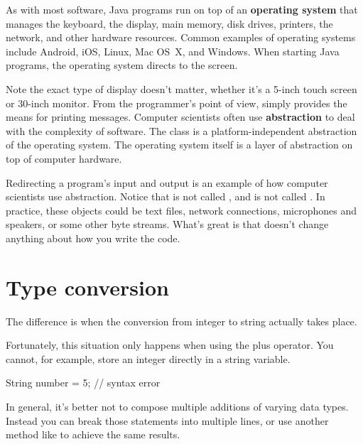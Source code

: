 

As with most software, Java programs run on top of an {\bf operating system} that manages the keyboard, the display, main memory, disk drives, printers, the network, and other hardware resources.
Common examples of operating systems include Android, iOS, Linux, Mac OS~X, and Windows.
When starting Java programs, the operating system directs  to the screen.


Note the exact type of display doesn't matter, whether it's a 5-inch touch screen or 30-inch monitor.
From the programmer's point of view,  simply provides the means for printing messages.
Computer scientists often use {\bf abstraction} to deal with the complexity of software.
The  class is a platform-independent abstraction of the operating system.
The operating system itself is a layer of abstraction on top of computer hardware.


Redirecting a program's input and output is an example of how computer scientists use abstraction.
Notice that  is not called , and  is not called .
In practice, these objects could be text files, network connections, microphones and speakers, or some other byte streams.
What's great is that doesn't change anything about how you write the code.


\section{Type conversion}

The difference is when the conversion from integer to string actually takes place.

Fortunately, this situation only happens when using the plus operator.
You cannot, for example, store an integer directly in a string variable.

\begin{code}
String number = 5;  // syntax error
\end{code}

In general, it's better not to compose multiple additions of varying data types.
Instead you can break those statements into multiple lines, or use another method like  to achieve the same results.

